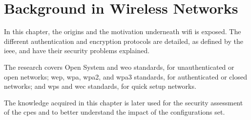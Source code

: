 \section{Background in Wireless Networks}
\label{section:bgd_wlan}

In this chapter, the origins and the motivation underneath \gls{wifi} is exposed. The different authentication and encryption protocols are detailed, as defined by the \gls{ieee}, and have their security problems explained.

The research covers Open System and \gls{weo} standards, for unauthenticated or open networks; \gls{wep}, \gls{wpa}, \gls{wpa}2, and \gls{wpa}3 standards, for authenticated or closed networks; and \gls{wps} and \gls{wec} standards, for quick setup networks.

The knowledge acquired in this chapter is later used for the security assessment of the \glspl{cpe} and to better understand the impact of the configurations set.





